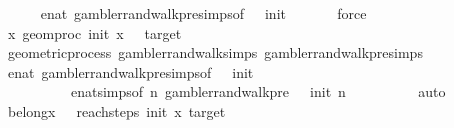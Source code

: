 \begin{isabellebody}
\ \ \ \ \isamarkupfalse%
\ enat{\isacharunderscore}{\kern0pt}{}\ gambler{\isacharunderscore}{\kern0pt}rand{\isacharunderscore}{\kern0pt}walk{\isacharunderscore}{\kern0pt}pre{\isachardot}{\kern0pt}simps{\isacharparenleft}{\kern0pt}{}{\isacharparenright}{\kern0pt}{\isacharbrackleft}{\kern0pt}of\ {}\ {\isachardoublequoteopen}{\isacharminus}{\kern0pt}{}{\isachardoublequoteclose}\ init\ {\isacharunderscore}{\kern0pt}{\isacharbrackright}{\kern0pt}\isanewline
\ \ \ \ \isamarkupfalse%
\ force\isanewline
\ \ \isamarkupfalse%
\ \isamarkupfalse%
\ {\isachardoublequoteopen}{\isasymAnd}x{\isachardot}{\kern0pt}\ geom{\isacharunderscore}{\kern0pt}proc\ init\ x\ {}\ {\isacharequal}{\kern0pt}\ target{\isachardoublequoteclose}\isanewline
\ \ \ \ \isamarkupfalse%
\ geometric{\isacharunderscore}{\kern0pt}process\ gambler{\isacharunderscore}{\kern0pt}rand{\isacharunderscore}{\kern0pt}walk{\isachardot}{\kern0pt}simps\ gambler{\isacharunderscore}{\kern0pt}rand{\isacharunderscore}{\kern0pt}walk{\isacharunderscore}{\kern0pt}pre{\isachardot}{\kern0pt}simps\isanewline
\ \ \ \ \isamarkupfalse%
\ enat{\isacharunderscore}{\kern0pt}{}\ gambler{\isacharunderscore}{\kern0pt}rand{\isacharunderscore}{\kern0pt}walk{\isacharunderscore}{\kern0pt}pre{\isachardot}{\kern0pt}simps{\isacharparenleft}{\kern0pt}{}{\isacharparenright}{\kern0pt}{\isacharbrackleft}{\kern0pt}of\ {}\ {\isachardoublequoteopen}{\isacharminus}{\kern0pt}{}{\isachardoublequoteclose}\ init\ {\isacharunderscore}{\kern0pt}{\isacharbrackright}{\kern0pt}\ \isanewline
\ \ \ \ \ \ \ \ \ \ enat{\isachardot}{\kern0pt}simps{\isacharparenleft}{\kern0pt}{}{\isacharparenright}{\kern0pt}{\isacharbrackleft}{\kern0pt}of\ {\isachardoublequoteopen}{\isasymlambda}n{\isachardot}{\kern0pt}\ gambler{\isacharunderscore}{\kern0pt}rand{\isacharunderscore}{\kern0pt}walk{\isacharunderscore}{\kern0pt}pre\ {}\ {\isacharparenleft}{\kern0pt}{\isacharminus}{\kern0pt}{}{\isacharparenright}{\kern0pt}\ init\ n\ {\isacharunderscore}{\kern0pt}{\isachardoublequoteclose}\ {\isachardoublequoteopen}\ {\isacharminus}{\kern0pt}{}{\isachardoublequoteclose}\ {}{\isacharbrackright}{\kern0pt}\isanewline
\ \ \ \ \isamarkupfalse%
\ auto\isanewline
\ \ \isamarkupfalse%
\ \isamarkupfalse%
\ belong{\isacharunderscore}{\kern0pt}{}{\isacharcolon}{\kern0pt}{\isachardoublequoteopen}{\isasymforall}x{\isachardot}{\kern0pt}\ {}\ {\isasymin}\ reach{\isacharunderscore}{\kern0pt}steps\ init\ x\ target{\isachardoublequoteclose}\isanewline

\end{isabellebody}
